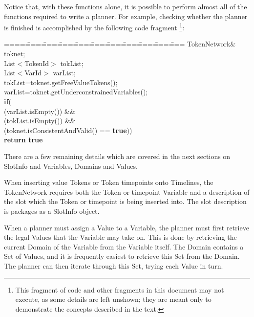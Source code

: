 Notice that, with these functions alone, it is possible to perform
almost all of the functions required to write a planner.  For example,
checking whether the planner is finished is accomplished by the
following code fragment \footnote{This fragment of code and other
fragments in this document may not execute, as some details are left
unshown; they are meant only to demonstrate the concepts described in
the text.}:

\begin{tabbing}
====\====\====\====\====\====\====\====\====\====\====\kill
TokenNetwork\& toknet;\\
List$<$TokenId$>$ tokList;\\
List$<$VarId$>$ varList;\\
tokList=toknet.getFreeValueTokens();\\
varList=toknet.getUnderconstrainedVariables();\\
{\bf if}(\\
\> (varList.isEmpty()) \&\&\\
\> (tokList.isEmpty()) \&\&\\
\> (toknet.isConsistentAndValid() == {\bf true}))\\
\> \> {\bf return true}\\
\end{tabbing}

There are a few remaining details which are covered in the next
sections on SlotInfo and Variables, Domains and Values.

When inserting value Tokens or Token timepoints onto Timelines, the TokenNetwork requires
both the Token or timepoint Variable and a description of the slot which the Token
or timepoint is being inserted into.  The slot description is packages as a SlotInfo
object.


When a planner must assign a Value to a Variable, the planner must
first retrieve the legal Values that the Variable may take on.  This
is done by retrieving the current Domain of the Variable from the
Variable itself.  The Domain contains a Set of Values, and it is
frequently easiest to retrieve this Set from the Domain.  The planner
can then iterate through this Set, trying each Value in turn.

